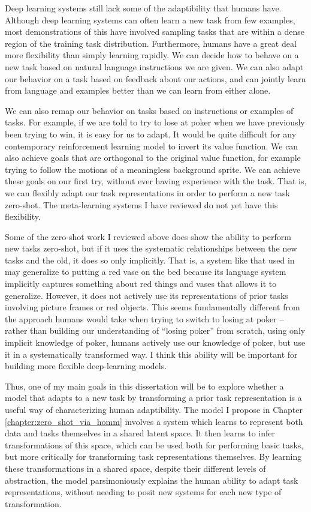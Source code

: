 Deep learning systems still lack some of the adaptibility that humans have. Although deep learning systems can often learn a new task from few examples, most demonstrations of this have involved sampling tasks that are within a dense region of the training task distribution. Furthermore, humans have a great deal more flexibility than simply learning rapidly. We can decide how to behave on a new task based on natural language instructions we are given. We can also adapt our behavior on a task based on feedback about our actions, and can jointly learn from language and examples better than we can learn from either alone. \par
We can also remap our behavior on tasks based on instructions or examples of tasks. For example, if we are told to try to lose at poker when we have previously been trying to win, it is easy for us to adapt. It would be quite difficult for any contemporary reinforcement learning model to invert its value function. We can also achieve goals that are orthogonal to the original value function, for example trying to follow the motions of a meaningless background sprite. We can achieve these goals on our first try, without ever having experience with the task. That is, we can flexibly adapt our task representations in order to perform a new task zero-shot. The meta-learning systems I have reviewed do not yet have this flexibility. \par
Some of the zero-shot work I reviewed above does show the ability to perform new tasks zero-shot, but if it uses the systematic relationships between the new tasks and the old, it does so only implicitly. That is, a system like that used in \citet{Hill2019a} may generalize to putting a red vase on the bed because its language system implicitly captures something about red things and vases that allows it to generalize. However, it does not actively use its representations of prior tasks involving picture frames or red objects. This seems fundamentally different from the approach humans would take when trying to switch to losing at poker -- rather than building our understanding of ``losing poker'' from scratch, using only implicit knowledge of poker, humans actively use our knowledge of poker, but use it in a systematically transformed way. I think this ability will be important for building more flexible deep-learning models. \par
Thus, one of my main goals in this dissertation will be to explore whether a model that adapts to a new task by transforming a prior task representation is a useful way of characterizing human adaptibility. The model I propose in Chapter \ref{chapter:zero_shot_via_homm} involves a system which learns to represent both data and tasks themselves in a shared latent space. It then learns to infer transformations of this space, which can be used both for performing basic tasks, but more critically for transforming task representations themselves. By learning these transformations in a shared space, despite their different levels of abstraction, the model parsimoniously explains the human ability to adapt task representations, without needing to posit new systems for each new type of transformation. \par
